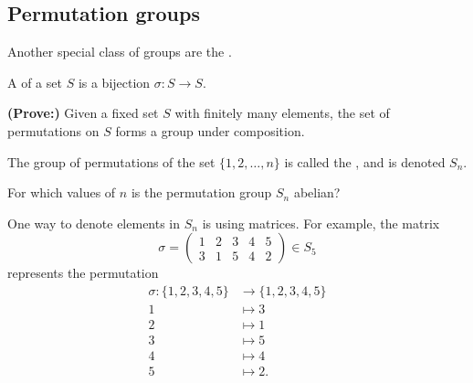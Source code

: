\documentclass[../UNABRIDGEDalgebraNotesMSRI-UP2016.tex]{subfiles}
\begin{document}
\subsection[\subsecname]{Permutation groups}
\begin{frame}[c]{\subsecname}{}
Another special class of groups are the .

\smallGap
\begin{dfn}
A  of a set $S$ is a bijection $\sigma:S\to S$.
\end{dfn}

\smallGap
\begin{exe}\label{exe:permutations}
\textbf{(Prove:)} Given a fixed set $S$ with finitely many elements, the set of permutations on $S$ forms a group under composition.
\end{exe}
\end{frame}

\begin{frame}[c]
\begin{dfn}
The group of permutations of the set $\{1,2,\dots,n\}$ is called the , and is denoted $S_n$.
\end{dfn}

\smallGap
\begin{exe}\label{exe:permAbelian}
For which values of $n$ is the permutation group $S_n$ abelian?
\end{exe}
\end{frame}

\begin{frame}
\begin{ex}\label{ex:permMatrices1}
One way to denote elements in $S_n$ is using matrices.  For example, the matrix
\[
\sigma=\begin{pmatrix}
	1 & 2 & 3 & 4 & 5 \\
	3 & 1 & 5 & 4 & 2
	\end{pmatrix}\in S_5
\]
represents the permutation
\begin{align*}
\sigma:\{1,2,3,4,5\} &\to \{1,2,3,4,5\} \\
	1 &\mapsto 3 \\
	2 &\mapsto 1 \\
	3 &\mapsto 5 \\
	4 &\mapsto 4 \\
	5 &\mapsto 2.
\end{align*}
\end{ex}
\end{frame}
\end{document}
